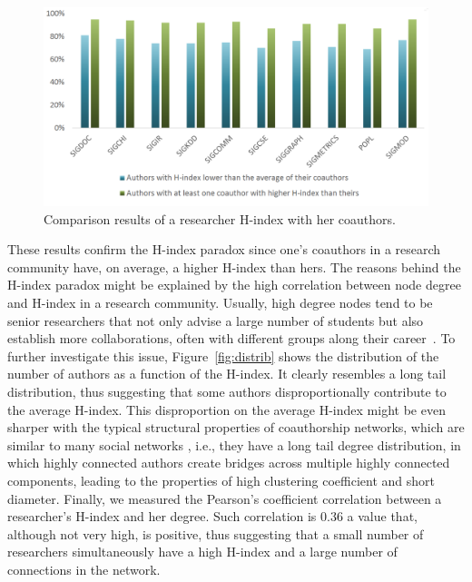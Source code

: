 \documentclass[smallextended]{svjour3}
\begin{document}
\begin{figure}[t]
  \centering
  \includegraphics[width=.99\textwidth]{fig1.pdf}
  \caption{Comparison results of a researcher H-index with her coauthors.}
  \label{fig:comp}
\end{figure}


These results confirm the H-index paradox since one's coauthors in a research community have, on average, a higher H-index than hers. The reasons behind the H-index paradox might be explained by the high correlation between node degree and H-index in a research community. Usually, high degree nodes tend to be senior researchers that not only advise a large number of students but also establish more collaborations, often with different groups along their career~\cite{um}. To further investigate this issue, Figure~\ref{fig:distrib} shows the distribution of the number of authors as a function of the H-index. It clearly resembles a long tail distribution, thus suggesting that some authors disproportionally contribute to the average H-index. This disproportion on the average H-index might be even sharper with the typical structural properties of coauthorship networks, which are similar to many social networks \cite{seis,oito}, i.e., they have a long tail degree distribution, in which highly connected authors create bridges across multiple highly connected components, leading to the properties of high clustering coefficient and short diameter. Finally, we measured the Pearson's coefficient correlation between a researcher's H-index and her degree. Such correlation is 0.36 a value that, although not very high, is positive, thus suggesting that a small number of researchers simultaneously have a high H-index and a large number of connections in the network.
\end{document}
